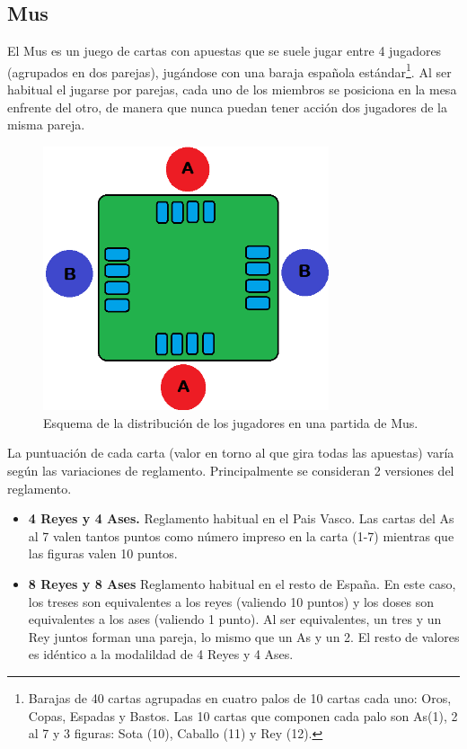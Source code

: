 \subsection{Mus}

El Mus es un juego de cartas con apuestas que se suele jugar entre 4 jugadores (agrupados en dos parejas), jugándose con una baraja española estándar\footnote{Barajas de 40 cartas agrupadas en cuatro palos de 10 cartas cada uno: Oros, Copas, Espadas y Bastos. Las 10 cartas que componen cada palo son As(1), 2 al 7 y 3 figuras: Sota (10), Caballo (11) y Rey (12).}. Al ser habitual el jugarse por parejas, cada uno de los miembros se posiciona en la mesa enfrente del otro, de manera que nunca puedan tener acción dos jugadores de la misma pareja.

\begin{figure}[h]
\centering
\includegraphics[width=0.75\textwidth]{figuras/Mus.png}   
\caption{Esquema de la distribución de los jugadores en una partida de Mus. \cite{propiaPaint}}
\label{fig:mus}
\end{figure}

La puntuación de cada carta (valor en torno al que gira todas las apuestas) varía según las variaciones de reglamento. Principalmente se consideran 2 versiones del reglamento. \cite{mus,mus2}
\begin{itemize}
\item \textbf{4 Reyes y 4 Ases.} Reglamento habitual en el Pais Vasco. Las cartas del As al 7 valen tantos puntos como número impreso en la carta (1-7) mientras que las figuras valen 10 puntos.
\item \textbf{8 Reyes y 8 Ases} Reglamento habitual en el resto de España. En este caso, los treses son equivalentes a los reyes (valiendo 10 puntos) y los doses son equivalentes a los ases (valiendo 1 punto). Al ser equivalentes, un tres y un Rey juntos forman una pareja, lo mismo que un As y un 2. El resto de valores es idéntico a la modalildad de 4 Reyes y 4 Ases.
\end{itemize}

